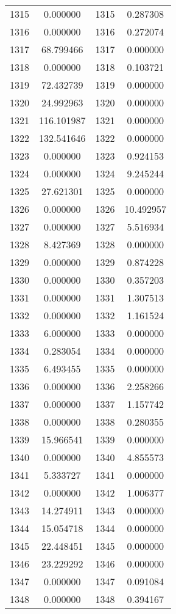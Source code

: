 \documentclass[12pt]{article}
\begin{document}
\begin{longtable}{@{}cccc@{}}
1315 & 0.000000 & 1315 & 0.287308 \\
1316 & 0.000000 & 1316 & 0.272074 \\
1317 & 68.799466 & 1317 & 0.000000 \\
1318 & 0.000000 & 1318 & 0.103721 \\
1319 & 72.432739 & 1319 & 0.000000 \\
1320 & 24.992963 & 1320 & 0.000000 \\
1321 & 116.101987 & 1321 & 0.000000 \\
1322 & 132.541646 & 1322 & 0.000000 \\
1323 & 0.000000 & 1323 & 0.924153 \\
1324 & 0.000000 & 1324 & 9.245244 \\
1325 & 27.621301 & 1325 & 0.000000 \\
1326 & 0.000000 & 1326 & 10.492957 \\
1327 & 0.000000 & 1327 & 5.516934 \\
1328 & 8.427369 & 1328 & 0.000000 \\
1329 & 0.000000 & 1329 & 0.874228 \\
1330 & 0.000000 & 1330 & 0.357203 \\
1331 & 0.000000 & 1331 & 1.307513 \\
1332 & 0.000000 & 1332 & 1.161524 \\
1333 & 6.000000 & 1333 & 0.000000 \\
1334 & 0.283054 & 1334 & 0.000000 \\
1335 & 6.493455 & 1335 & 0.000000 \\
1336 & 0.000000 & 1336 & 2.258266 \\
1337 & 0.000000 & 1337 & 1.157742 \\
1338 & 0.000000 & 1338 & 0.280355 \\
1339 & 15.966541 & 1339 & 0.000000 \\
1340 & 0.000000 & 1340 & 4.855573 \\
1341 & 5.333727 & 1341 & 0.000000 \\
1342 & 0.000000 & 1342 & 1.006377 \\
1343 & 14.274911 & 1343 & 0.000000 \\
1344 & 15.054718 & 1344 & 0.000000 \\
1345 & 22.448451 & 1345 & 0.000000 \\
1346 & 23.229292 & 1346 & 0.000000 \\
1347 & 0.000000 & 1347 & 0.091084 \\
1348 & 0.000000 & 1348 & 0.394167 \\

\end{longtable}
\end{document}
